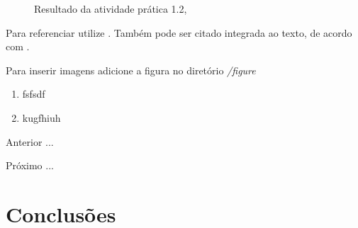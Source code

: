 \begin{figure}[H] %
  \center
  \caption{Resultado da atividade prática 1.2, \cite{alguem2022nada}}\label{fig:ap1_cod_vigual1}
\end{figure}



Para referenciar utilize \cite{ninguem2022curioso}. Também pode ser citado integrada ao texto, de acordo com .

Para inserir imagens adicione a figura no diretório \textit{/figure}






\begin{enumerate}[label=\Roman{*}, ref=(\roman{*})]
  \item fsfsdf
  \item kugfhiuh
\end{enumerate}

\begin{asparaenum}
\item Anterior ... \cite{ninguem2022curioso}
\item Próximo ... \label{pl1}
\end{asparaenum}





\section{Conclusões}



